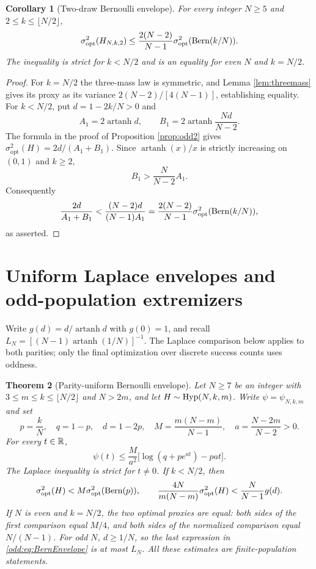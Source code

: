 \documentclass[11pt,a4paper]{article}
\newtheorem{theorem}{Theorem}[section]
\newtheorem{corollary}[theorem]{Corollary}
\begin{document}
\begin{corollary}[Two-draw Bernoulli envelope]\label{cor:two_bern_envelope}
For every integer $N\ge5$ and $2\le k\le\lfloor N/2\rfloor$,
\[
 \sigma^2_{\mathrm{opt}}(H_{N,k,2})
 \le\frac{2(N-2)}{N-1}\sigma^2_{\mathrm{opt}}(\operatorname{Bern}(k/N)).
\]
The inequality is strict for $k<N/2$ and is an equality for even $N$ and $k=N/2$.
\end{corollary}
\begin{proof}
For $k=N/2$ the three-mass law is symmetric, and Lemma \ref{lem:threemass} gives its proxy as its variance $2(N-2)/[4(N-1)]$, establishing equality. For $k<N/2$, put $d=1-2k/N>0$ and
\[
 A_1=2\operatorname{artanh}d,\qquad
 B_1=2\operatorname{artanh}\frac{Nd}{N-2}.
\]
The formula in the proof of Proposition \ref{prop:odd2} gives
$\sigma^2_{\mathrm{opt}}(H)=2d/(A_1+B_1)$. Since $\operatorname{artanh}(x)/x$ is strictly increasing on $(0,1)$ and $k\ge2$,
\[
 B_1>\frac{N}{N-2}A_1.
\]
Consequently
\[
 \frac{2d}{A_1+B_1}<\frac{(N-2)d}{(N-1)A_1}
 =\frac{2(N-2)}{N-1}\sigma^2_{\mathrm{opt}}(\operatorname{Bern}(k/N)),
\]
as asserted.
\end{proof}



\section{Uniform Laplace envelopes and odd-population extremizers}\label{sec:odd_uniform}
Write $g(d)=d/\operatorname{artanh}d$ with $g(0)=1$, and recall $L_N=[(N-1)\operatorname{artanh}(1/N)]^{-1}$. The Laplace comparison below applies to both parities; only the final optimization over discrete success counts uses oddness.

\begin{theorem}[Parity-uniform Bernoulli envelope]\label{odd:thm:envelope}
Let $N\ge7$ be an integer with $3\le m\le k\le\lfloor N/2\rfloor$ and $N>2m$, and let $H\sim\operatorname{Hyp}(N,k,m)$. Write $\psi=\psi_{N,k,m}$ and set
\[
 p=\frac{k}{N},\quad q=1-p,\quad d=1-2p,\quad
 M=\frac{m(N-m)}{N-1},\quad a=\frac{N-2m}{N-2}>0.
\]
For every $t\in\mathbb R$,
\begin{equation}\label{odd:eq:laplace}
 \boxed{\quad
 \psi(t)\le\frac{M}{a^2}\bigl[\log(q+pe^{at})-pat\bigr].\quad}
\end{equation}
The Laplace inequality is strict for $t\ne0$. If $k<N/2$, then
\begin{equation}\label{odd:eq:BernEnvelope}
 \sigma^2_{\rm opt}(H)<M\sigma^2_{\rm opt}(\operatorname{Bern}(p)),\qquad
 \frac{4N}{m(N-m)}\sigma^2_{\rm opt}(H)
 <\frac{N}{N-1}g(d).
\end{equation}
If $N$ is even and $k=N/2$, the two optimal proxies are equal: both sides of the first comparison equal $M/4$, and both sides of the normalized comparison equal $N/(N-1)$. For odd $N$, $d\ge 1/N$, so the last expression in \eqref{odd:eq:BernEnvelope} is at most $L_N$.
All these estimates are finite-population statements.
\end{theorem}
\end{document}
